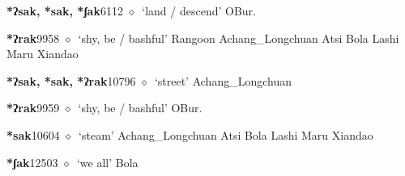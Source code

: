   \begin{list}{}{\leftmargin=1.5em \itemindent=-1.5em}
  \item {\footnotesize \textbf{*ʔsak, *sak, *ʃak}}{\tiny 6112}
         $\diamond$~`land / descend'
         OBur. 
  \item {\footnotesize \textbf{*ʔrak}}{\tiny 9958}
\hspace{1ex}
         $\diamond$~`shy, be / bashful'
         Rangoon 
\hspace{1ex}
         Achang\_Longchuan 
\hspace{1ex}
         Atsi 
\hspace{1ex}
         Bola 
\hspace{1ex}
         Lashi 
\hspace{1ex}
         Maru 
\hspace{1ex}
         Xiandao 
  \item {\footnotesize \textbf{*ʔsak, *sak, *ʔrak}}{\tiny 10796}
\hspace{1ex}
         $\diamond$~`street'
         Achang\_Longchuan 
  \item {\footnotesize \textbf{*ʔrak}}{\tiny 9959}
\hspace{1ex}
         $\diamond$~`shy, be / bashful'
         OBur. 
  \item {\footnotesize \textbf{*sak}}{\tiny 10604}
\hspace{1ex}
         $\diamond$~`steam'
         Achang\_Longchuan 
\hspace{1ex}
         Atsi 
\hspace{1ex}
         Bola 
\hspace{1ex}
         Lashi 
\hspace{1ex}
         Maru 
\hspace{1ex}
         Xiandao 
  \item {\footnotesize \textbf{*ʃak}}{\tiny 12503}
\hspace{1ex}
         $\diamond$~`we all'
         Bola 
\hspace{1ex}

\end{list}
